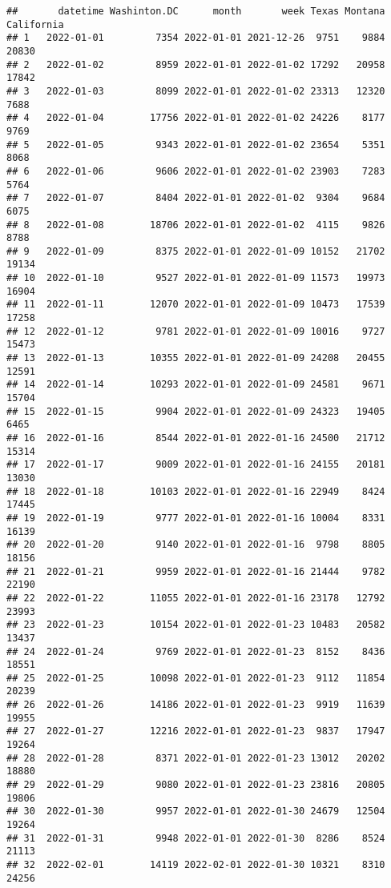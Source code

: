 \documentclass[
]{article}
\begin{document}
\begin{verbatim}
##       datetime Washinton.DC      month       week Texas Montana California
## 1   2022-01-01         7354 2022-01-01 2021-12-26  9751    9884      20830
## 2   2022-01-02         8959 2022-01-01 2022-01-02 17292   20958      17842
## 3   2022-01-03         8099 2022-01-01 2022-01-02 23313   12320       7688
## 4   2022-01-04        17756 2022-01-01 2022-01-02 24226    8177       9769
## 5   2022-01-05         9343 2022-01-01 2022-01-02 23654    5351       8068
## 6   2022-01-06         9606 2022-01-01 2022-01-02 23903    7283       5764
## 7   2022-01-07         8404 2022-01-01 2022-01-02  9304    9684       6075
## 8   2022-01-08        18706 2022-01-01 2022-01-02  4115    9826       8788
## 9   2022-01-09         8375 2022-01-01 2022-01-09 10152   21702      19134
## 10  2022-01-10         9527 2022-01-01 2022-01-09 11573   19973      16904
## 11  2022-01-11        12070 2022-01-01 2022-01-09 10473   17539      17258
## 12  2022-01-12         9781 2022-01-01 2022-01-09 10016    9727      15473
## 13  2022-01-13        10355 2022-01-01 2022-01-09 24208   20455      12591
## 14  2022-01-14        10293 2022-01-01 2022-01-09 24581    9671      15704
## 15  2022-01-15         9904 2022-01-01 2022-01-09 24323   19405       6465
## 16  2022-01-16         8544 2022-01-01 2022-01-16 24500   21712      15314
## 17  2022-01-17         9009 2022-01-01 2022-01-16 24155   20181      13030
## 18  2022-01-18        10103 2022-01-01 2022-01-16 22949    8424      17445
## 19  2022-01-19         9777 2022-01-01 2022-01-16 10004    8331      16139
## 20  2022-01-20         9140 2022-01-01 2022-01-16  9798    8805      18156
## 21  2022-01-21         9959 2022-01-01 2022-01-16 21444    9782      22190
## 22  2022-01-22        11055 2022-01-01 2022-01-16 23178   12792      23993
## 23  2022-01-23        10154 2022-01-01 2022-01-23 10483   20582      13437
## 24  2022-01-24         9769 2022-01-01 2022-01-23  8152    8436      18551
## 25  2022-01-25        10098 2022-01-01 2022-01-23  9112   11854      20239
## 26  2022-01-26        14186 2022-01-01 2022-01-23  9919   11639      19955
## 27  2022-01-27        12216 2022-01-01 2022-01-23  9837   17947      19264
## 28  2022-01-28         8371 2022-01-01 2022-01-23 13012   20202      18880
## 29  2022-01-29         9080 2022-01-01 2022-01-23 23816   20805      19806
## 30  2022-01-30         9957 2022-01-01 2022-01-30 24679   12504      19264
## 31  2022-01-31         9948 2022-01-01 2022-01-30  8286    8524      21113
## 32  2022-02-01        14119 2022-02-01 2022-01-30 10321    8310      24256

\end{verbatim}
\end{document}
